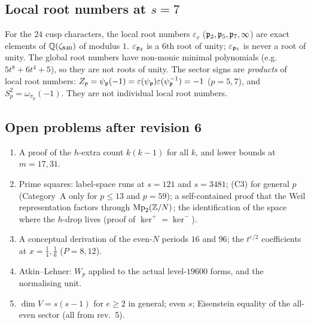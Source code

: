 \subsection{Local root numbers at $s=7$}\label{sec:rev6al}
\begin{proposition}[\src{35}]\label{prop:al6}
For the $24$ cusp characters, the local root numbers $\varepsilon_v$ ($\mathfrak{p}_2,\mathfrak{p}_5,\mathfrak{p}_7,\infty$) are exact elements of $\mathbb{Q}(\zeta_{840})$ of modulus $1$. $\varepsilon_{\mathfrak{p}_2}$ is a $6$th root of unity; $\varepsilon_{\mathfrak{p}_5}$ is never a root of unity. The global root numbers have non-monic minimal polynomials (e.g.\ $5t^8+6t^4+5$), so they are not roots of unity. The sector signs are \emph{products} of local root numbers: $Z_p=\psi_{\mathfrak{p}}(-1)=\varepsilon(\psi_{\mathfrak{p}})\varepsilon(\psi_{\mathfrak{p}}^{-1})=-1$ ($p=5,7$), and $S_p^2=\omega_{\pi_p}(-1)$. They are not individual local root numbers.
\end{proposition}

\subsection{Open problems after revision 6}\label{sec:open6}
\begin{enumerate}[leftmargin=2em]
\item A proof of the $h$-extra count $k(k-1)$ for all $k$, and lower bounds at $m=17,31$.
\item Prime squares: label-space runs at $s=121$ and $s=3481$; (C3) for general $p$ (Category~A only for $p\le13$ and $p=59$); a self-contained proof that the Weil representation factors through $\mathrm{Mp}_2(\mathbb{Z}/N)$; the identification of the space where the $h$-drop lives (proof of $\ker^+=\ker^-$).
\item A conceptual derivation of the even-$N$ periods $16$ and $96$; the $t^{e/2}$ coefficients at $x=\tfrac14,\tfrac16$ ($P=8,12$).
\item Atkin--Lehner: $W_p$ applied to the actual level-$19600$ forms, and the normalising unit.
\item $\dim V=s(s-1)$ for $e\ge2$ in general; even $s$; Eisenstein equality of the all-even sector (all from rev.~5).
\end{enumerate}
